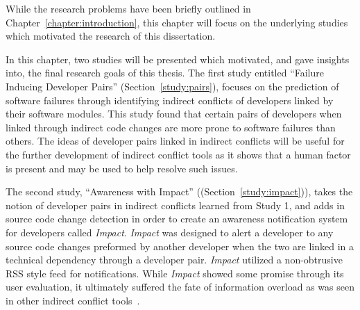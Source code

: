 \label{chapter:motivating}

\newlength{\savedunitlength}
\setlength{\unitlength}{2em}

While the research problems have been briefly outlined in Chapter~\ref{chapter:introduction}, this chapter
will focus on the underlying studies which motivated the research of this dissertation.

In this chapter, two studies will be presented which motivated, and gave insights into, 
the final research goals
of this thesis. The first study entitled ``Failure Inducing Developer Pairs''
(Section~\ref{study:pairs}), focuses on the prediction of
software failures through identifying indirect conflicts of developers linked by their software modules. 
This study found that certain pairs of developers when linked through indirect code changes are more prone
to software failures than others. The ideas of developer pairs linked in indirect conflicts will be
useful for the further development of indirect conflict tools as it shows that a human factor is present
and may be used to help resolve such issues.

The second study, ``Awareness with Impact'' ((Section~\ref{study:impact})), 
takes the notion of developer
pairs in indirect conflicts learned from Study 1, and adds in source code change detection in order to create
an awareness notification system for developers called \textit{Impact}. \textit{Impact} was designed to alert a developer
to any source code changes preformed by another developer when the two are linked in a technical dependency through
a developer pair. \textit{Impact} utilized a non-obtrusive RSS style feed for notifications. 
While \textit{Impact} showed some promise through its user evaluation, it ultimately suffered the fate of information
overload as was seen in other indirect conflict tools~\cite{Sarma:2007:TSA,Servant:2010:CPI,Trainer:2005:BGT}.




\setlength{\unitlength}{\savedunitlength}
